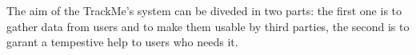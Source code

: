 The aim of the TrackMe's system can be diveded in two parts: the first one is to gather data from users and to make them usable by third parties, the second is to garant a tempestive help to users who needs it.\\
